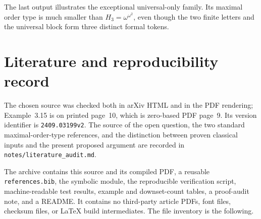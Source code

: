 \documentclass[11pt,a4paper]{article}
\numberwithin{equation}{section}
\theoremstyle{definition}
\theoremstyle{remark}
\begin{document}
The last output illustrates the exceptional universal-only family. Its
maximal order type is much smaller than $H_3=\omega^{\omega^2}$, even
though the two finite letters and the universal block form three distinct
formal tokens.

\section{Literature and reproducibility record}
The chosen source was checked both in arXiv HTML and in the PDF rendering;
Example~3.15 is on printed page~10, which is zero-based PDF page~9. Its
version identifier is \texttt{2409.03199v2}. The source of the open question,
the two standard maximal-order-type references, and the distinction between
proven classical inputs and the present proposed argument are recorded in
\texttt{notes/literature\_audit.md}.

The archive contains this source and its compiled PDF, a reusable
\texttt{references.bib}, the symbolic module, the reproducible verification
script, machine-readable test results, example and downset-count tables,
a proof-audit note, and a README. It contains no third-party article PDFs,
font files, checksum files, or LaTeX build intermediates. The file inventory
is the following.
\end{document}
